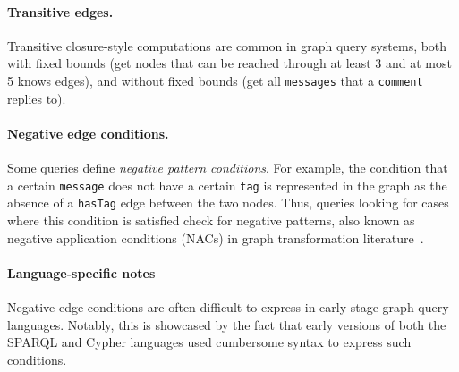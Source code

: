 \paragraph{Transitive edges.} Transitive closure-style computations are common in graph query systems, both with fixed bounds
(\eg get nodes that can be reached through at least 3 and at most 5 \textsf{knows} edges),
and without fixed bounds
(\eg get all \texttt{messages} that a \texttt{comment} replies to).

\paragraph{Negative edge conditions.} Some queries define \emph{negative pattern conditions}. For example, the condition that a certain \texttt{message} does not have a certain \texttt{tag} is represented in the graph as the absence of a \texttt{hasTag} edge between the two nodes. Thus, queries looking for cases where this condition is satisfied check for negative patterns, also known as negative application conditions (NACs) in graph transformation literature~\cite{DBLP:journals/fuin/HabelHT96}.

\paragraph{Language-specific notes}

Negative edge conditions are often difficult to express in early stage graph query languages. Notably, this is showcased by the fact that early versions of both the SPARQL and Cypher languages used cumbersome syntax to express such conditions.

